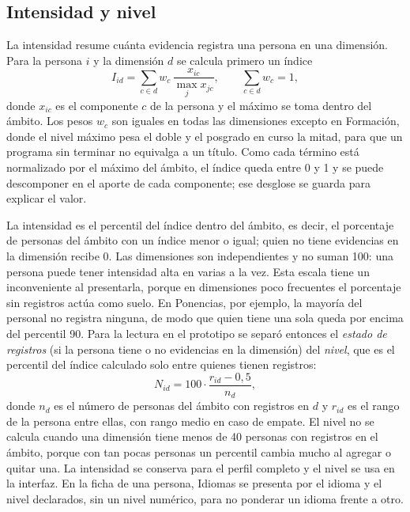 \subsection{Intensidad y nivel}
\label{sec:met_intensidad}

La intensidad resume cuánta evidencia registra una persona en una dimensión. Para la persona $i$ y la dimensión $d$ se calcula primero un índice
\begin{equation}
    I_{id} = \sum_{c \in d} w_c \, \frac{x_{ic}}{\max_j x_{jc}}, \qquad \sum_{c \in d} w_c = 1,
    \label{eq:indice}
\end{equation}
donde $x_{ic}$ es el componente $c$ de la persona y el máximo se toma dentro del ámbito. Los pesos $w_c$ son iguales en todas las dimensiones excepto en Formación, donde el nivel máximo pesa el doble y el posgrado en curso la mitad, para que un programa sin terminar no equivalga a un título. Como cada término está normalizado por el máximo del ámbito, el índice queda entre 0 y 1 y se puede descomponer en el aporte de cada componente; ese desglose se guarda para explicar el valor.

La intensidad es el percentil del índice dentro del ámbito, es decir, el porcentaje de personas del ámbito con un índice menor o igual; quien no tiene evidencias en la dimensión recibe 0. Las dimensiones son independientes y no suman 100: una persona puede tener intensidad alta en varias a la vez. Esta escala tiene un inconveniente al presentarla, porque en dimensiones poco frecuentes el porcentaje sin registros actúa como suelo. En Ponencias, por ejemplo, la mayoría del personal no registra ninguna, de modo que quien tiene una sola queda por encima del percentil 90. Para la lectura en el prototipo se separó entonces el \textit{estado de registros} (si la persona tiene o no evidencias en la dimensión) del \textit{nivel}, que es el percentil del índice calculado solo entre quienes tienen registros:
\begin{equation}
    N_{id} = 100 \cdot \frac{r_{id} - 0{,}5}{n_d},
    \label{eq:nivel}
\end{equation}
donde $n_d$ es el número de personas del ámbito con registros en $d$ y $r_{id}$ es el rango de la persona entre ellas, con rango medio en caso de empate. El nivel no se calcula cuando una dimensión tiene menos de 40 personas con registros en el ámbito, porque con tan pocas personas un percentil cambia mucho al agregar o quitar una. La intensidad se conserva para el perfil completo y el nivel se usa en la interfaz. En la ficha de una persona, Idiomas se presenta por el idioma y el nivel declarados, sin un nivel numérico, para no ponderar un idioma frente a otro.

